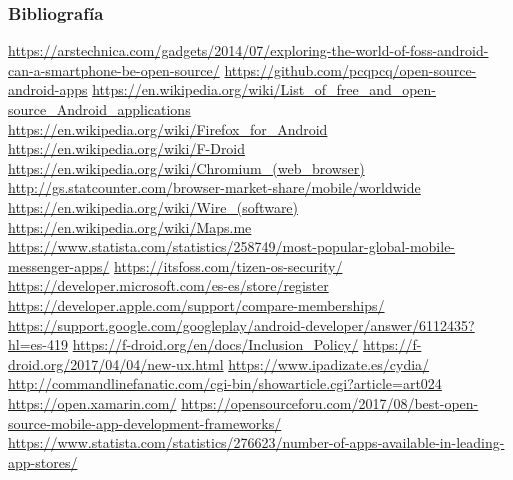 \documentclass[numfooter]{beamer}
\begin{document}
\begin{frame}

    \frametitle{Bibliografía}
    \small{
    \url{https://arstechnica.com/gadgets/2014/07/exploring-the-world-of-foss-android-can-a-smartphone-be-open-source/}
    \url{https://github.com/pcqpcq/open-source-android-apps}
    \url{https://en.wikipedia.org/wiki/List_of_free_and_open-source_Android_applications}
    \url{https://en.wikipedia.org/wiki/Firefox_for_Android}
    \url{https://en.wikipedia.org/wiki/F-Droid}
    \url{https://en.wikipedia.org/wiki/Chromium_(web_browser)}
    \url{http://gs.statcounter.com/browser-market-share/mobile/worldwide}
    \url{https://en.wikipedia.org/wiki/Wire_(software)}
    \url{https://en.wikipedia.org/wiki/Maps.me}
    \url{https://www.statista.com/statistics/258749/most-popular-global-mobile-messenger-apps/}
    \url{https://itsfoss.com/tizen-os-security/}
	\url{https://developer.microsoft.com/es-es/store/register}
	\url{https://developer.apple.com/support/compare-memberships/}
	\url{https://support.google.com/googleplay/android-developer/answer/6112435?hl=es-419}
	\url{https://f-droid.org/en/docs/Inclusion_Policy/}
	\url{https://f-droid.org/2017/04/04/new-ux.html}
	\url{https://www.ipadizate.es/cydia/}
	\url{http://commandlinefanatic.com/cgi-bin/showarticle.cgi?article=art024}
	\url{https://open.xamarin.com/}
	\url{https://opensourceforu.com/2017/08/best-open-source-mobile-app-development-frameworks/}
	\url{https://www.statista.com/statistics/276623/number-of-apps-available-in-leading-app-stores/}
    }
\end{frame}
\end{document}

